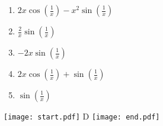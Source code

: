 \documentclass[12pt]{article}
\begin{document}
\begin{enumerate}
\begin{enumerate}

\item $2x\cos{\left(\frac{1}{x}\right)}-x^2\sin{\left(\frac{1}{x}\right)}$

\item $\frac{2}{x}\sin{\left(\frac{1}{x}\right)}$

\item $-2x\sin{\left(\frac{1}{x}\right)}$

\item $2x\cos{\left(\frac{1}{x}\right)}+\sin{\left(\frac{1}{x}\right)}$

\item $\sin{\left(\frac{1}{x}\right)}$

\end{enumerate}

\texttt{[image: start.pdf]}
{{D}}
\texttt{[image: end.pdf]}


\end{enumerate}
\end{document}
